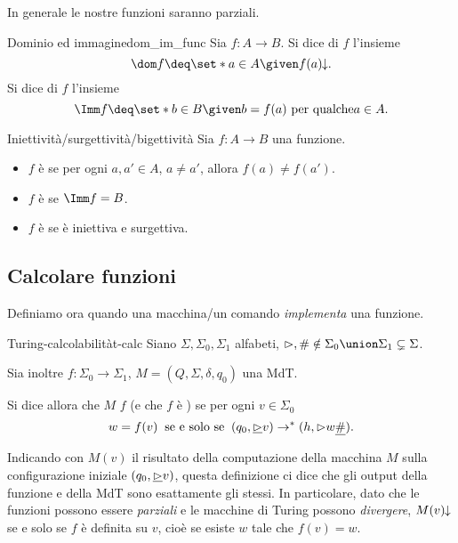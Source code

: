 In generale le nostre funzioni saranno parziali.

\begin{definition}
    {Dominio ed immagine}{dom_im_func}
    Sia $f : A \to B$. Si dice  di $f$ l'insieme \[
        \dom f \deq \set*{a \in A \given f(a)\conv}.
    \]  Si dice  di $f$ l'insieme \[
        \Imm f \deq \set*{b \in B \given b = f(a) \text{ per qualche} a \in A}.
    \]
\end{definition}

\begin{definition}
    {Iniettività/surgettività/bigettività}{}
    Sia $f : A \to B$ una funzione. 
    \begin{itemize}
        \item $f$ è  se per ogni $a, a' \in A$, $a \neq a'$, allora $f(a) \neq f(a')$.
        \item $f$ è  se $\Imm f = B$.
        \item $f$ è  se è iniettiva e surgettiva.     
    \end{itemize}
\end{definition}

\subsection*{Calcolare funzioni}

Definiamo ora quando una macchina/un comando \emph{implementa} una funzione.

\begin{definition}
    {Turing-calcolabilità}{t-calc}
    Siano $\Sigma, \Sigma_0, \Sigma_1$ alfabeti, $\resp, \# \notin \Sigma_0 \union \Sigma_1 \subsetneq \Sigma$.

    Sia inoltre $f : \Sigma_0 \to \Sigma_1$, $M = (Q, \Sigma, \delta, q_0)$ una MdT.

    Si dice allora che $M$  $f$ (e che $f$ è ) se per ogni $v \in \Sigma_0$ \[
        w = f(v) \;\;\text{se e solo se}\;\; (q_0, \underline{{\vartriangleright}}v) \to^\ast (h, {\vartriangleright} w \underline{\#}).
    \]
\end{definition}

Indicando con $M(v)$ il risultato della computazione della macchina $M$ sulla configurazione iniziale $(q_0, \underline{{\vartriangleright}}v)$, questa definizione ci dice che gli output della funzione e della MdT sono esattamente gli stessi. 
In particolare, dato che le funzioni possono essere \emph{parziali} e le macchine di Turing possono \emph{divergere}, $M(v)\!\!\downarrow$ se e solo se $f$ è definita su $v$, cioè se esiste $w$ tale che $f(v) = w$.

